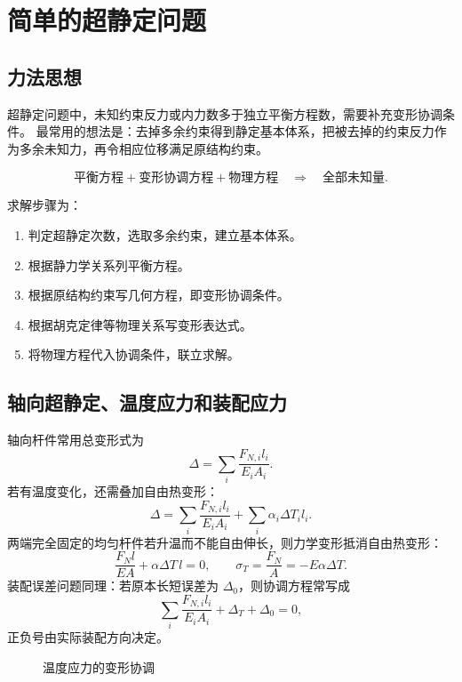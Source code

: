 \documentclass[a4,10pt,comentarios]{aleph-notas}
\begin{document}
\section{简单的超静定问题}

\subsection{力法思想}

超静定问题中，未知约束反力或内力数多于独立平衡方程数，需要补充变形协调条件。
最常用的想法是：去掉多余约束得到静定基本体系，把被去掉的约束反力作为多余未知力，再令相应位移满足原结构约束。

\[
    \text{平衡方程}+\text{变形协调方程}+\text{物理方程}
    \quad\Longrightarrow\quad
    \text{全部未知量}.
\]

求解步骤为：
\begin{enumerate}[label=\arabic*.]
    \item 判定超静定次数，选取多余约束，建立基本体系。
    \item 根据静力学关系列平衡方程。
    \item 根据原结构约束写几何方程，即变形协调条件。
    \item 根据胡克定律等物理关系写变形表达式。
    \item 将物理方程代入协调条件，联立求解。
\end{enumerate}

\subsection{轴向超静定、温度应力和装配应力}

轴向杆件常用总变形式为
\[
    \Delta=\sum_i\frac{F_{N,i}l_i}{E_iA_i}.
\]
若有温度变化，还需叠加自由热变形：
\[
    \Delta
    =\sum_i\frac{F_{N,i}l_i}{E_iA_i}
    +\sum_i \alpha_i\Delta T_i l_i.
\]
两端完全固定的均匀杆件若升温而不能自由伸长，则力学变形抵消自由热变形：
\[
    \frac{F_Nl}{EA}+\alpha\Delta T\,l=0,
    \qquad
    \sigma_T=\frac{F_N}{A}=-E\alpha\Delta T.
\]
装配误差问题同理：若原本长短误差为 $\Delta_0$，则协调方程常写成
\[
    \sum_i\frac{F_{N,i}l_i}{E_iA_i}+\Delta_T+\Delta_0=0,
\]
正负号由实际装配方向决定。

\begin{figure}[H]
    \centering
    \caption{温度应力的变形协调}
\end{figure}
\end{document}

